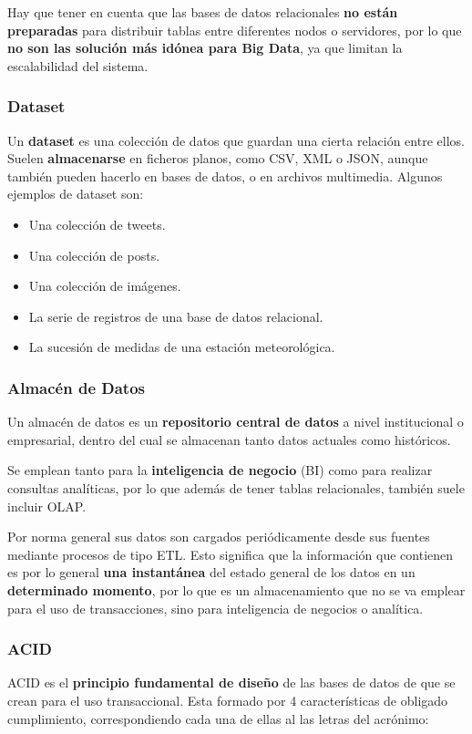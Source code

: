 Hay que tener en cuenta que las bases de datos relacionales \textbf{no están preparadas} para distribuir tablas entre diferentes nodos o servidores, por lo que \textbf{no son las solución más idónea para Big Data}, ya que limitan la escalabilidad del sistema.


\subsubsection{Dataset}
Un \textbf{dataset} es una colección de datos que guardan una cierta relación entre ellos. Suelen \textbf{almacenarse} en ficheros planos, como CSV, XML o JSON, aunque también pueden hacerlo en bases de datos, o en archivos multimedia. Algunos ejemplos de dataset son:

\begin{itemize}
	\item Una colección de tweets.
	\item Una colección de posts.
	\item Una colección de imágenes.
	\item La serie de registros de una base de datos relacional.
	\item La sucesión de medidas de una estación meteorológica.
\end{itemize}

\subsubsection{Almacén de Datos}
Un almacén de datos es un \textbf{repositorio central de datos} a nivel institucional o empresarial, dentro del cual se almacenan tanto datos actuales como históricos.

Se emplean tanto para la \textbf{inteligencia de negocio} (BI) como para realizar consultas analíticas, por lo que además de tener tablas relacionales, también suele incluir \gls{OLAP}.

Por norma general sus datos son cargados periódicamente desde sus fuentes mediante procesos de tipo \gls{ETL}. Esto significa que la información que contienen es por lo general \textbf{una instantánea }del estado general de los datos en un \textbf{determinado momento}, por lo que es un almacenamiento que no se va emplear para el uso de transacciones, sino para inteligencia de negocios o analítica.

\subsubsection{ACID}
ACID es el \textbf{principio fundamental de diseño} de las bases de datos de que se crean para el uso transaccional. Esta formado por 4 características de obligado cumplimiento, correspondiendo cada una de ellas al las letras del acrónimo:


